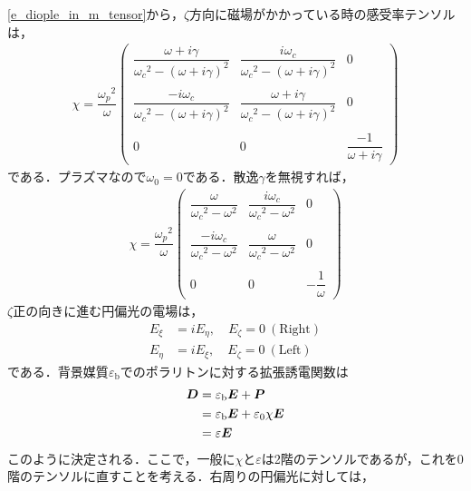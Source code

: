 \eqref{e_diople_in_m_tensor}から，$\zeta$方向に磁場がかかっている時の感受率テンソルは，
\begin{align}
  \chi =
  \dfrac{{\omega_p}^2}{\omega}\left(
  \begin{array}{ccc}
    \dfrac{\omega+i\gamma}{{\omega_c}^2-(\omega+i\gamma)^2} & \dfrac{i\omega_c}{{\omega_c}^2-(\omega+i\gamma)^2} & 0 \\ \\
    \dfrac{-i\omega_c}{{\omega_c}^2-(\omega+i\gamma)^2} & \dfrac{\omega+i\gamma}{{\omega_c}^2-(\omega+i\gamma)^2} & 0 \\ \\
    0 & 0 & \dfrac{-1}{\omega+i\gamma}
  \end{array}
  \right)
\end{align}
である．プラズマなので$\omega_0=0$である．散逸$\gamma$を無視すれば，
\begin{align}
  \chi =
  \dfrac{{\omega_p}^2}{\omega}\left(
  \begin{array}{ccc}
    \dfrac{\omega}{{\omega_c}^2-\omega^2} & \dfrac{i\omega_c}{{\omega_c}^2-\omega^2} & 0 \\ \\
    \dfrac{-i\omega_c}{{\omega_c}^2-\omega^2} & \dfrac{\omega}{{\omega_c}^2-\omega^2} & 0 \\ \\
    0 & 0 & -\dfrac{1}{\omega}
  \end{array}
  \right)
  \label{helicon_tensor}
\end{align}
$\zeta$正の向きに進む円偏光の電場は，
\begin{align}
  E_{\xi} &= iE_{\eta} , \quad  E_{\zeta}=0 ~ (\text{Right}) \label{helicon_right}\\
  E_{\eta} &= iE_{\xi} , \quad E_{\zeta}=0 ~ (\text{Left}) \label{helicon_left}
\end{align}
である．背景媒質$\varepsilon_{\text{b}}$でのポラリトンに対する拡張誘電関数は
\begin{align}
  \boldsymbol{D} &= \varepsilon_{\text{b}}\boldsymbol{E}+\boldsymbol{P}\notag\\
  &= \varepsilon_{\text{b}}\boldsymbol{E}+\varepsilon_0\chi\boldsymbol{E}\notag\\
  &= \varepsilon\boldsymbol{E}
\end{align}
このように決定される．ここで，一般に$\chi$と$\varepsilon$は2階のテンソルであるが，これを0階のテンソルに直すことを考える．右周りの円偏光に対しては，
